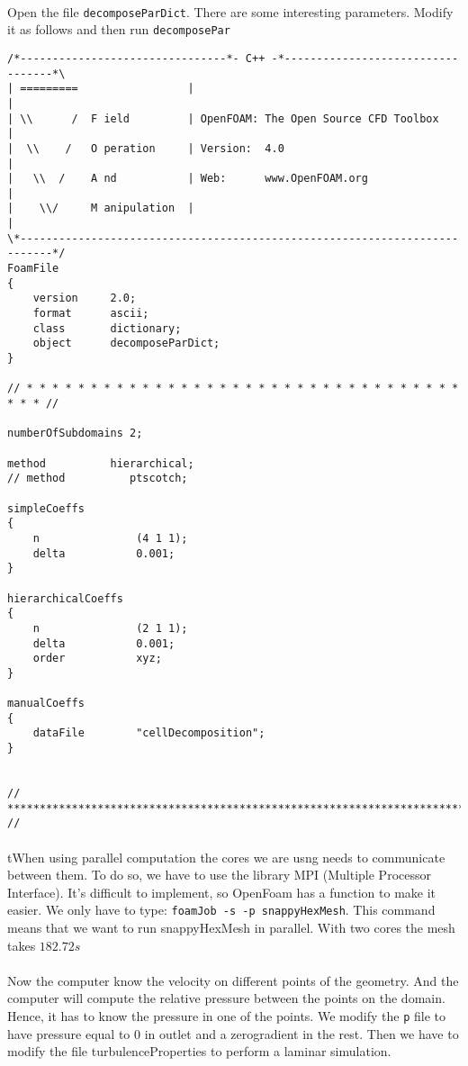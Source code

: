 \paragraph{}Open the file \lstinline!decomposeParDict!. There are some interesting parameters. Modify it as follows and then run \texttt{decomposePar}

\begin{tiny}
\begin{lstlisting}
/*--------------------------------*- C++ -*----------------------------------*\
| =========                 |                                                 |
| \\      /  F ield         | OpenFOAM: The Open Source CFD Toolbox           |
|  \\    /   O peration     | Version:  4.0                                   |
|   \\  /    A nd           | Web:      www.OpenFOAM.org                      |
|    \\/     M anipulation  |                                                 |
\*---------------------------------------------------------------------------*/
FoamFile
{
    version     2.0;
    format      ascii;
    class       dictionary;
    object      decomposeParDict;
}

// * * * * * * * * * * * * * * * * * * * * * * * * * * * * * * * * * * * * * //

numberOfSubdomains 2;

method          hierarchical;
// method          ptscotch;

simpleCoeffs
{
    n               (4 1 1);
    delta           0.001;
}

hierarchicalCoeffs
{
    n               (2 1 1);
    delta           0.001;
    order           xyz;
}

manualCoeffs
{
    dataFile        "cellDecomposition";
}


// ************************************************************************* //
\end{lstlisting}
\end{tiny}

\paragraph{}tWhen using parallel computation the cores we are usng needs to communicate between them. To do so, we have to use the library MPI (Multiple Processor Interface). It's difficult to implement, so OpenFoam has a function to make it easier. We only have to type: \lstinline!foamJob -s -p snappyHexMesh!. This command means that we want to run snappyHexMesh in parallel. With two cores the mesh takes $182.72 s$
\paragraph{}Now the computer know the velocity on different points of the geometry. And the computer will compute the relative pressure between the points on the domain. Hence, it has to know the pressure in one of the points. We modify the \texttt{p} file to have pressure equal to 0 in outlet and a zerogradient in the rest. Then we have to modify the file turbulenceProperties to perform a laminar simulation. 
